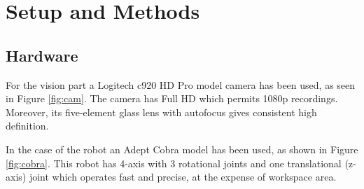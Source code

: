 \chapter{Setup and Methods}\label{ch:hardware}

\section{Hardware}

For the vision part a Logitech c920 HD Pro model camera has been used, as seen in Figure \ref{fig:cam}. The camera has Full HD which permits 1080p recordings. Moreover, its five-element glass lens with autofocus gives consistent high definition.

In the case of the robot an Adept Cobra model has been used, as shown in Figure \ref{fig:cobra}. This robot has 4-axis with 3 rotational joints and one translational (z-axis) joint which operates fast and precise, at the expense of workspace area. 

